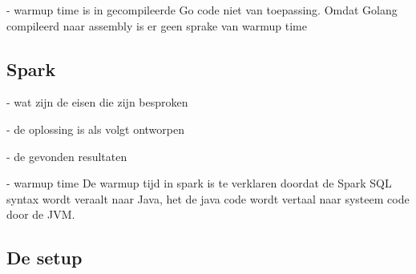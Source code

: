 - warmup time is in gecompileerde Go code niet van toepassing.
Omdat Golang compileerd naar assembly is er geen sprake van warmup time

\subsection{Spark}

- wat zijn de eisen die zijn besproken

- de oplossing is als volgt ontworpen

- de gevonden resultaten

- warmup time
De warmup tijd in spark is te verklaren doordat de Spark SQL syntax wordt veraalt naar Java, het de java code wordt vertaal naar systeem code door de JVM.


\subsection{De setup}
\label{subsec:3.4hardware_specs}







